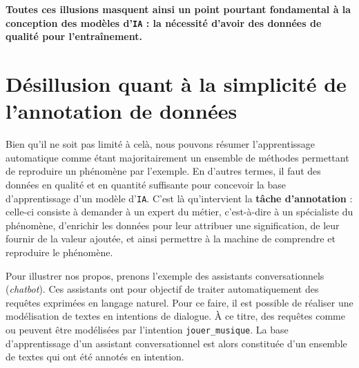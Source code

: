 		\textbf{Toutes ces illusions masquent ainsi un point pourtant fondamental à la conception des modèles d'\texttt{IA} : la nécessité d'avoir des données de qualité pour l'entraînement.}
		
		
	\section*{Désillusion quant à la simplicité de l'annotation de données}
		
		Bien qu'il ne soit pas limité à celà, nous pouvons résumer l'apprentissage automatique comme étant majoritairement un ensemble de méthodes permettant de reproduire un phénomène par l'exemple.
		En d'autres termes, il faut des données en qualité et en quantité suffisante pour concevoir la base d'apprentissage d'un modèle d'\texttt{IA}.
		C'est là qu'intervient la \textbf{tâche d'annotation} : celle-ci consiste à demander à un expert du métier, c'est-à-dire à un spécialiste du phénomène, d'enrichir les données pour leur attribuer une signification, de leur fournir de la valeur ajoutée, et ainsi permettre à la machine de comprendre et reproduire le phénomène.
		\newline
		
		Pour illustrer nos propos, prenons l'exemple des assistants conversationnels (\textit{chatbot}).
		Ces assistants ont pour objectif de traiter automatiquement des requêtes exprimées en langage naturel.
		Pour ce faire, il est possible de réaliser une modélisation de textes en intentions de dialogue.
		À ce titre, des requêtes comme  ou  peuvent être modélisées par l'intention \texttt{jouer\_musique}.
		La base d'apprentissage d'un assistant conversationnel est alors constituée d'un ensemble de textes qui ont été annotés en intention.
		
